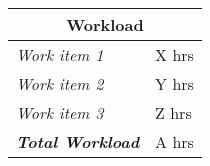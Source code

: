 \begin{minipage}{\linewidth}
\setlength{\tabcolsep}{15pt}
\centering
{}
\begin{tabular}{ |l|l| }
	\hline
	\multicolumn{2}{|c|}{\cellcolor{gray!25} Workload} \\
	\hline
	\it{Work item 1} & X hrs\\
	\it{Work item 2} & Y hrs\\
	\it{Work item 3} & Z hrs\\
	\hline
	\textbf{\textit{Total Workload}} & A hrs\\
	\hline
\end{tabular}
\end{minipage}
